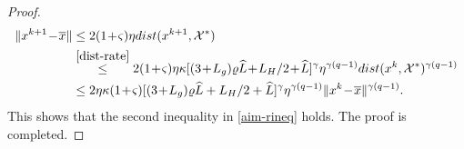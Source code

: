 \documentclass[10pt,a4paper]{amsart}
\begin{document}
\begin{proof}
 \begin{align*}
 \|x^{k+1}\!-\!\overline{x}\|
 &\le 2(1\!+\!\varsigma)\eta{\rm dist}(x^{k+1},\mathcal{X}^*)\\
 &\stackrel{\eqref{dist-rate}}{\le}2(1\!+\!\varsigma)\eta\kappa[(3\!+\!L_g)\varrho \widehat{L}\!+\!L_H/2\!+\!\widehat{L}]^{\gamma}\eta^{\gamma(q-1)}{\rm dist}(x^k,\mathcal{X}^*)^{\gamma(q-1)}\\
 &\le2\eta\kappa(1\!+\!\varsigma)[(3\!+\!L_g)\varrho \widehat{L}+L_H/2+\widehat{L}]^{\gamma}\eta^{\gamma(q-1)} \|x^k\!-\!\overline{x}\|^{\gamma(q-1)}.
 \end{align*} 
 This shows that the second inequality in \eqref{aim-rineq} holds. The proof is completed.
 \end{proof}
\end{document}
